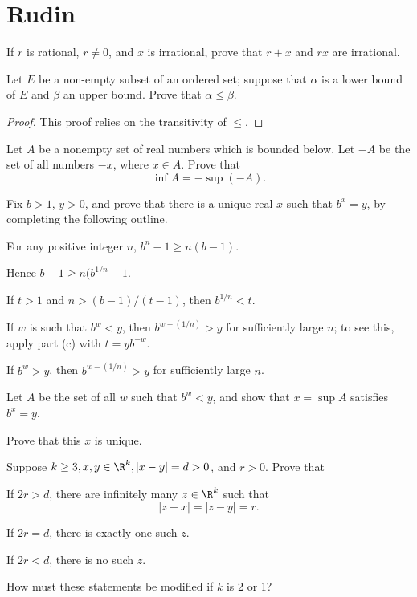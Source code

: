 \documentclass{assignment}
\begin{document}

\section*{Rudin}
\begin{question}[1]
  If $r$ is rational, $r\neq 0$, and $x$ is irrational, prove that $r+x$ and $rx$ are irrational.
\end{question}

\begin{question}[4]
  Let $E$ be a non-empty subset of an ordered set; suppose that $\alpha$ is a lower bound of $E$ and
$\beta$ an upper bound. Prove that $\alpha\leq\beta$.
\end{question}
\begin{proof}
  This proof relies on the transitivity of $\leq$.
\end{proof}

\begin{question}[5]
  Let $A$ be a nonempty set of real numbers which is bounded below. Let $-A$ be the set of all numbers
  $-x$, where $x\in A$. Prove that $$\inf A = -\sup(-A).$$
\end{question}

\begin{question}[7]
  Fix $b > 1$, $y > 0$, and prove that there is a unique real $x$ such that $b^x = y$, by completing
  the following outline.
  \begin{qparts}
    \item For any positive integer $n$, $b^n - 1 \geq n(b-1)$.
    \item Hence $b - 1 \geq n(b^{1/n} - 1$. 
    \item If $t > 1$ and $n > (b-1)/(t-1)$, then $b^{1/n} < t$.
    \item If $w$ is such that $b^w < y$, then $b^{w + (1/n)} > y$ for sufficiently large $n$; to see this,
      apply part (c) with $t = yb^{-w}$. 
    \item If $b^w > y$, then $b^{w - (1/n)} > y$ for sufficiently large $n$.
    \item Let $A$ be the set of all $w$ such that $b^w < y$, and show that $x = \sup A$ satisfies $b^x 
      = y$. 
    \item Prove that this $x$ is unique.
  \end{qparts}
\end{question}

\begin{question}[16]
  Suppose $k\geq 3, x,y\in\R^k, |x - y| = d > 0$, and $r > 0$. Prove that 
  \begin{qparts}
    \item If $2r > d$, there are infinitely many $z\in\R^k$ such that $$|z-x| = |z - y| = r.$$
    \item If $2r = d$, there is exactly one such $z$.
    \item If $2r < d$, there is no such $z$.
  \end{qparts}
  How must these statements be modified if $k$ is 2 or 1?
\end{question}
\end{document}
